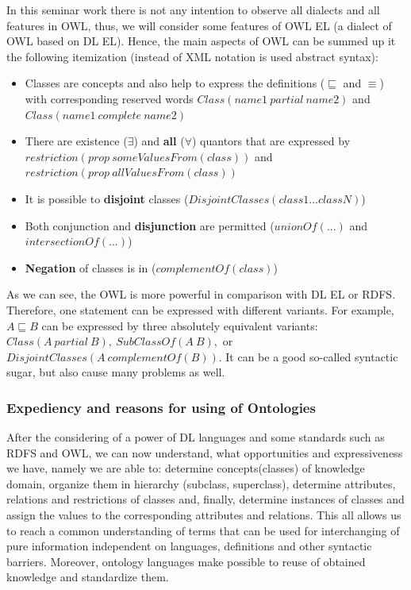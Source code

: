 		In this seminar work there is not any intention to observe all dialects and all features in OWL, thus, we will consider some features of OWL EL (a dialect of OWL based on DL EL). Hence, the main aspects of OWL can be summed up it the following itemization (instead of XML notation is used abstract syntax): 
			\begin{itemize}
				\item Classes are concepts and also help to express the definitions ($\sqsubseteq$ and $\equiv$) with corresponding reserved words $Class(name1\  partial\ name2)$ and $Class(name1\ complete\ name2)$
				\item There are existence ($\exists$) and \textbf{all} ($\forall$) quantors that are expressed by \newline
				 $restriction(prop\ someValuesFrom(class))$ and $restriction(prop\  allValuesFrom(class))$
				\item It is possible to \textbf{disjoint} classes ($DisjointClasses(class1 ... classN)$)
				\item Both conjunction and \textbf{disjunction} are permitted ($unionOf(...)$ and $intersectionOf(...)$)
				\item \textbf{Negation} of classes is in ($complementOf(class)$)   
			\end{itemize}
		As we can see, the OWL is more powerful in comparison with DL EL or RDFS. Therefore, one statement can be expressed with different variants. For example, $A \sqsubseteq B$ can be expressed by three absolutely equivalent variants: $Class(A\ partial\ B),\ SubClassOf(A\  B),$ or $DisjointClasses(A\ complementOf(B))$. It can be a good so-called syntactic sugar, but also cause many problems as well.  
		\subsubsection{Expediency and reasons for using of Ontologies}
		After the considering of a power of DL languages and some standards such as RDFS and OWL, we can now understand, what opportunities and expressiveness we have, namely we are able to: determine concepts(classes) of knowledge domain, organize them in hierarchy (subclass, superclass), determine attributes, relations and restrictions of classes and, finally, determine instances of classes and assign the values to the corresponding attributes and relations. This all allows us to reach a common understanding of terms that can be used for interchanging of pure information independent on languages, definitions and other syntactic barriers. Moreover, ontology languages make possible to reuse of obtained knowledge and standardize them. 
		

